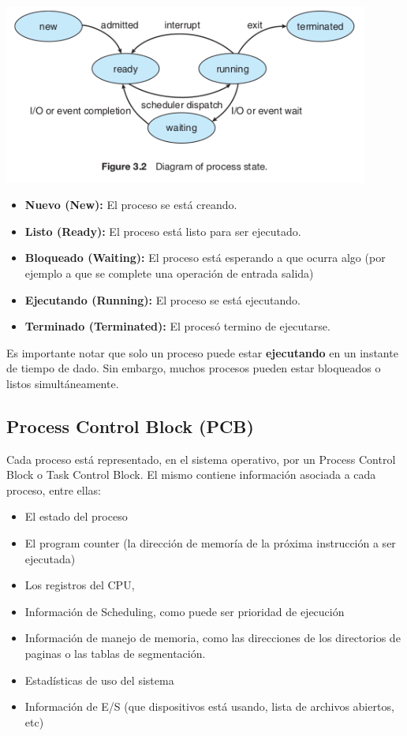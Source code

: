 \begin{center}
	\vspace*{0.5cm}
	\includegraphics[width=0.9\textwidth]{imagenes/estados-proceso.png}
\end{center}

\begin{itemize}
	\item \textbf{Nuevo (New):} El proceso se está creando.
	\item \textbf{Listo (Ready):} El proceso está listo para ser ejecutado.
	\item \textbf{Bloqueado (Waiting):} El proceso está esperando a que ocurra algo (por ejemplo a que se complete una operación de entrada salida)
	\item \textbf{Ejecutando (Running):} El proceso se está ejecutando.
	\item \textbf{Terminado (Terminated):} El procesó termino de ejecutarse.
\end{itemize}

Es importante notar que solo un proceso puede estar \textbf{ejecutando} en un instante de tiempo de dado. Sin embargo, muchos procesos pueden estar bloqueados o listos simultáneamente.

\subsection{Process Control Block (PCB)}\label{process::pcb}
Cada proceso está representado, en el sistema operativo, por un Process Control Block o Task Control Block. El mismo contiene información asociada a cada proceso, entre ellas:
\begin{itemize}
	\item El estado del proceso
	\item El program counter (la dirección de memoría de la próxima instrucción a ser ejecutada)
	\item Los registros del CPU,
	\item Información de Scheduling, como puede ser prioridad de ejecución
	\item Información de manejo de memoria, como las direcciones de los directorios de paginas o las tablas de segmentación.
	\item Estadísticas de uso del sistema
	\item Información de E/S (que dispositivos está usando, lista de archivos abiertos, etc)
\end{itemize}

